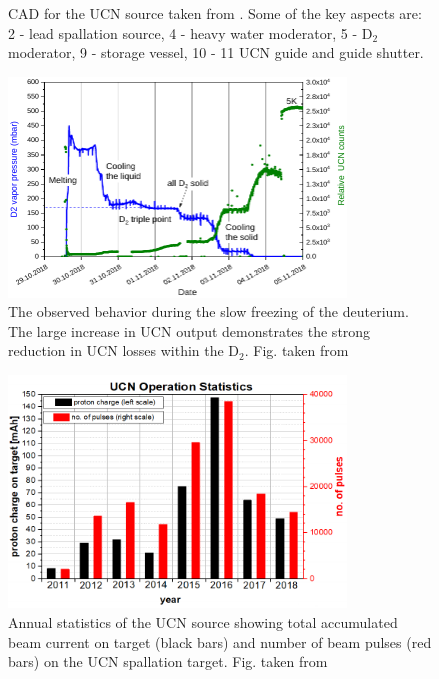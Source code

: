 \begin{refsection}
\begin{figure}
                \caption[UCN: source]{CAD for the UCN source taken from  \cite{PSI:review:2021}. Some of the key aspects are: 2 - lead spallation source, 4 - heavy water moderator, 5 - D$_2$ moderator, 9 - storage vessel, 10 - 11 UCN guide and guide shutter.}
                \label{fig:UCN_CAD}
            \end{figure}
            \begin{figure}
                \centering
                \includegraphics[width = 0.8\textwidth]{Figures/Introduction/UCN_behaviour.png}
                \caption[UCN: freezing behavior]{The observed behavior during the slow freezing of the deuterium. The large increase in UCN output demonstrates the strong reduction in UCN losses within the D$_2$. 
                Fig. taken from \cite{PSI:review:2021}}
                \label{fig:UCN_behaviour}
            \end{figure}
            \begin{figure}
                \centering
                \includegraphics[width = 0.8\textwidth]{Figures/Introduction/UCN_stats.png}
                \caption[UCN: source statistics]{Annual statistics of the UCN source showing total accumulated beam current on target (black bars) and number of beam pulses (red bars) on the UCN spallation target. 
                Fig. taken from \cite{PSI:review:2021}}
                \label{fig:UCN_stats}
            \end{figure}
            

\end{refsection}
